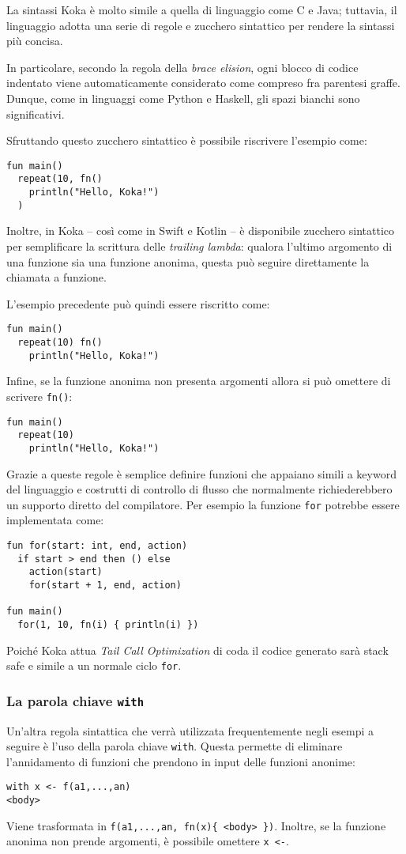 La sintassi Koka è molto simile a quella di linguaggio come C e Java; tuttavia, il linguaggio adotta una serie di regole e zucchero sintattico per rendere la sintassi più concisa.

In particolare, secondo la regola della \emph{brace elision}, ogni blocco di codice indentato viene automaticamente considerato come compreso fra parentesi graffe. Dunque, come in linguaggi come Python e Haskell, gli spazi bianchi sono significativi.

Sfruttando questo zucchero sintattico è possibile riscrivere l'esempio come:
\begin{lstlisting}[language=koka]
fun main()
  repeat(10, fn()
    println("Hello, Koka!")
  )
\end{lstlisting}

Inoltre, in Koka -- così come in Swift e Kotlin -- è disponibile zucchero sintattico per semplificare la scrittura delle \emph{trailing lambda}: qualora l'ultimo argomento di una funzione sia una funzione anonima, questa può seguire direttamente la chiamata a funzione.

L'esempio precedente può quindi essere riscritto come:
\begin{lstlisting}[language=koka]
fun main()
  repeat(10) fn()
    println("Hello, Koka!")
\end{lstlisting}
Infine, se la funzione anonima non presenta argomenti allora si può omettere di scrivere \lstinline{fn()}:
\begin{lstlisting}[language=koka]
fun main()
  repeat(10)
    println("Hello, Koka!")
\end{lstlisting}
Grazie a queste regole è semplice definire funzioni che appaiano simili a keyword del linguaggio e costrutti di controllo di flusso che normalmente richiederebbero un supporto diretto del compilatore.
Per esempio la funzione \lstinline{for} potrebbe essere implementata come:
\begin{lstlisting}[language=koka]
fun for(start: int, end, action)
  if start > end then () else
    action(start)
    for(start + 1, end, action)

fun main()
  for(1, 10, fn(i) { println(i) })
\end{lstlisting}
Poiché Koka attua \emph{Tail Call Optimization} di coda il codice generato sarà stack safe e simile a un normale ciclo \lstinline{for}.

\subsubsection{La parola chiave \lstinline{with}}
Un'altra regola sintattica che verrà utilizzata frequentemente negli esempi a seguire è l'uso della parola chiave \lstinline{with}. Questa permette di eliminare l'annidamento di funzioni che prendono in input delle funzioni anonime:
\begin{lstlisting}
with x <- f(a1,...,an)
<body>
\end{lstlisting}
Viene trasformata in \lstinline|f(a1,...,an, fn(x){ <body> })|. Inoltre, se la funzione anonima non prende argomenti, è possibile omettere \lstinline{x <-}.

